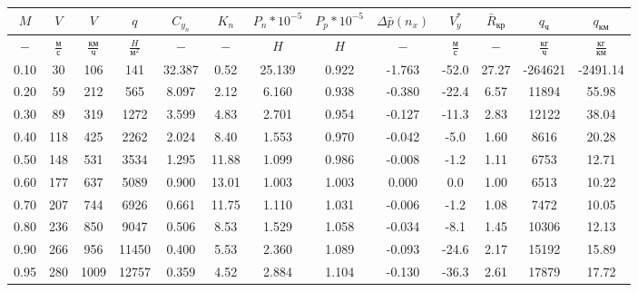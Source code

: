 \begin{tabular}{|c|c|c|c|c|c|c|c|c|c|c|c|c|}
\hline
$M$ & $V$ & $V$ & $q$ & $C_{y_n}$ & $K_n$ & $P_n*10^{-5}$ & $P_p*10^{-5}$ & $\Delta \bar{p}(n_x)$ & $V_y^*$ & $\bar{R}_{кр}$ & $q_{ч}$ & $q_{км}$ \\ 
\hline
$-$ & $\frac{м}{с}$ & $\frac{км}{ч}$ & $\frac{H}{м^2}$ & $-$ & $-$ & $H$ & $H$ & $-$ & $\frac{м}{с}$ & $-$ & $\frac{кг}{ч}$ & $\frac{кг}{км}$ \\ 
\hline
0.10 & 30 & 106 & 141 & 32.387 & 0.52 & 25.139 & 0.922 & -1.763 & -52.0 & 27.27 & -264621 & -2491.14 \\ 
\hline
0.20 & 59 & 212 & 565 & 8.097 & 2.12 & 6.160 & 0.938 & -0.380 & -22.4 & 6.57 & 11894 & 55.98 \\ 
\hline
0.30 & 89 & 319 & 1272 & 3.599 & 4.83 & 2.701 & 0.954 & -0.127 & -11.3 & 2.83 & 12122 & 38.04 \\ 
\hline
0.40 & 118 & 425 & 2262 & 2.024 & 8.40 & 1.553 & 0.970 & -0.042 & -5.0 & 1.60 & 8616 & 20.28 \\ 
\hline
0.50 & 148 & 531 & 3534 & 1.295 & 11.88 & 1.099 & 0.986 & -0.008 & -1.2 & 1.11 & 6753 & 12.71 \\ 
\hline
0.60 & 177 & 637 & 5089 & 0.900 & 13.01 & 1.003 & 1.003 & 0.000 & 0.0 & 1.00 & 6513 & 10.22 \\ 
\hline
0.70 & 207 & 744 & 6926 & 0.661 & 11.75 & 1.110 & 1.031 & -0.006 & -1.2 & 1.08 & 7472 & 10.05 \\ 
\hline
0.80 & 236 & 850 & 9047 & 0.506 & 8.53 & 1.529 & 1.058 & -0.034 & -8.1 & 1.45 & 10306 & 12.13 \\ 
\hline
0.90 & 266 & 956 & 11450 & 0.400 & 5.53 & 2.360 & 1.089 & -0.093 & -24.6 & 2.17 & 15192 & 15.89 \\ 
\hline
0.95 & 280 & 1009 & 12757 & 0.359 & 4.52 & 2.884 & 1.104 & -0.130 & -36.3 & 2.61 & 17879 & 17.72 \\ 
\hline
\end{tabular}